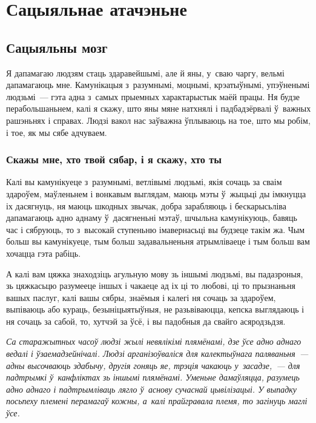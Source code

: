 \chapter{Сацыяльнае атачэньне}

\section{Сацыяльны мозг}

Я дапамагаю людзям стаць здаравейшымі, але й яны, у~сваю чаргу, вельмі дапамагаюць мне. Камунікацыя з~разумнымі, моцнымі, крэатыўнымі, упэўненымі людзьмі~--- гэта адна з~самых прыемных характарыстык маёй працы. Ня будзе перабольшаньнем, калі я скажу, што яны мяне натхнялі і падбадзёрвалі ў~важных рашэньнях і справах. Людзі вакол нас заўважна ўплываюць на тое, што мы робім, і тое, як мы сябе адчуваем.

\subsection*{Скажы мне, хто твой сябар, і я скажу, хто ты}

Калі вы камунікуеце з~разумнымі, ветлівымі людзьмі, якія сочаць за сваім здароўем, маўленьнем і вонкавым выглядам, маюць мэты ў~жыцьці ды імкнуцца іх дасягнуць, ня маюць шкодных звычак, добра зарабляюць і бескарысьліва дапамагаюць адно аднаму ў~дасягненьні мэтаў, шчыльна камунікуюць, бавяць час і сябруюць, то з~высокай ступеньню імавернасьці вы будзеце такім жа. Чым больш вы камунікуеце, тым больш задавальненьня атрымліваеце і тым больш вам хочацца гэта рабіць.

А калі вам цяжка знаходзіць агульную мову зь іншымі людзьмі, вы падазроныя, зь цяжкасьцю разумееце іншых і чакаеце ад іх ці то любові, ці то прызнаньня вашых паслуг, калі вашы сябры, знаёмыя і калегі ня сочаць за здароўем, выпіваюць або кураць, безыніцыятыўныя, не разьвіваюцца, кепска выглядаюць і ня сочаць за сабой, то, хутчэй за ўсё, і вы падобныя да свайго асяродзьдзя.


\emph{Са старажытных часоў людзі жылі невялікімі плямёнамі, дзе ўсе адно аднаго ведалі і ўзаемадзейнічалі. Людзі арганізоўваліся для калектыўнага паляваньня~--- адны высочваюць здабычу, другія гоняць яе, трэція чакаюць у~засадзе,~--- для падтрымкі ў~канфліктах зь іншымі плямёнамі. Уменьне дамаўляцца, разумець адно аднаго і падтрымліваць лягло ў~аснову сучаснай цывілізацыі. У выпадку посьпеху племені перамагаў кожны, а~калі прайгравала племя, то загінуць маглі ўсе.}

